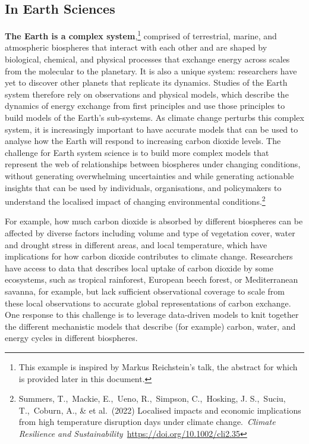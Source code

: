 {\hypertarget{in-earth-sciences}{%
\subsection{In Earth Sciences}\label{in-earth-sciences}}

\textbf{The Earth is a complex system},\footnote{This example is
  inspired by Markus Reichstein's talk, the abstract for which is
  provided later in this document.} comprised of terrestrial, marine,
and atmospheric biospheres that interact with each other and are shaped
by biological, chemical, and physical processes that exchange energy
across scales from the molecular to the planetary. It is also a unique
system: researchers have yet to discover other planets that replicate
its dynamics. Studies of the Earth system therefore rely on observations
and physical models, which describe the dynamics of energy exchange from
first principles and use those principles to build models of the Earth's
sub-systems. As climate change perturbs this complex system, it is
increasingly important to have accurate models that can be used to
analyse how the Earth will respond to increasing carbon dioxide levels.
The challenge for Earth system science is to build more complex models
that represent the web of relationships between biospheres under
changing conditions, without generating overwhelming uncertainties and
while generating actionable insights that can be used by individuals,
organisations, and policymakers to understand the localised impact of
changing environmental conditions.\footnote{Summers, T.,~Mackie,
  E.,~Ueno, R.,~Simpson, C.,~Hosking, J. S.,~Suciu, T.,~Coburn, A., \&
  et al.~(2022) Localised impacts and economic implications from high
  temperature disruption days under climate change.~\emph{Climate
  Resilience and Sustainability~}\url{https://doi.org/10.1002/cli2.35}}

For example, how much carbon dioxide is absorbed by different biospheres
can be affected by diverse factors including volume and type of
vegetation cover, water and drought stress in different areas, and local
temperature, which have implications for how carbon dioxide contributes
to climate change. Researchers have access to data that describes local
uptake of carbon dioxide by some ecosystems, such as tropical
rainforest, European beech forest, or Mediterranean savanna, for
example, but lack sufficient observational coverage to scale from these
local observations to accurate global representations of carbon
exchange. One response to this challenge is to leverage data-driven
models to knit together the different mechanistic models that describe
(for example) carbon, water, and energy cycles in different biospheres.

}
